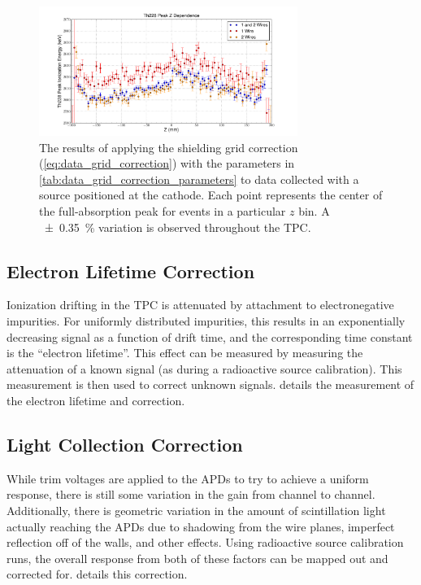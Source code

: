 \documentclass[herrin-thesis.tex]{subfiles}
\begin{document}
\begin{figure}[htp]
\centering
\includegraphics[width=0.75\textwidth]{./plots/data_grid_correction_applied.pdf}
\caption[The shielding grid correction applied to data]{The results of applying the shielding grid correction (\cref{eq:data_grid_correction}) with the parameters in \cref{tab:data_grid_correction_parameters} to data collected with a  source positioned at the cathode.  Each point represents the center of the full-absorption peak for events in a particular \(z\) bin. A \SI{\pm0.35}{\percent} variation is observed throughout the TPC.}
	\label{fig:data_grid_correction_applied}
\end{figure}

\subsection{Electron Lifetime Correction}
Ionization drifting in the TPC is attenuated by attachment to electronegative impurities. For uniformly distributed impurities, this results in an exponentially decreasing signal as a function of drift time, and the corresponding time constant is the ``electron lifetime''. This effect can be measured by measuring the attenuation of a known signal (as during a radioactive source calibration). This measurement is then used to correct unknown signals.  details the measurement of the electron lifetime and correction.

\subsection{Light Collection Correction}
While trim voltages are applied to the APDs to try to achieve a uniform response, there is still some variation in the gain from channel to channel. Additionally, there is geometric variation in the amount of scintillation light actually reaching the APDs due to shadowing from the wire planes, imperfect reflection off of the walls, and other effects. Using radioactive source calibration runs, the overall response from both of these factors can be mapped out and corrected for.  details this correction.
\end{document}
